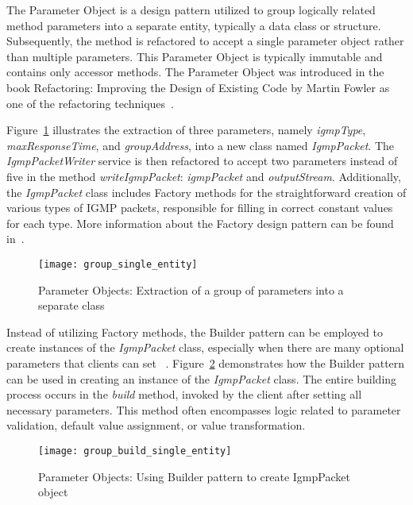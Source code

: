 The Parameter Object is a design pattern utilized to group logically related method parameters into a separate entity,
typically a data class or structure.
Subsequently, the method is refactored to accept a single parameter object rather than multiple parameters.
This Parameter Object is typically immutable and contains only accessor methods.
The Parameter Object was introduced in the book Refactoring: Improving the Design of Existing Code by Martin Fowler
as one of the refactoring techniques~\cite[Chapter~10]{fowler1999refactoring}.

Figure~\ref{fig:group_single_entity} illustrates the extraction of three parameters, namely \textit{igmpType},
\textit{maxResponseTime}, and \textit{groupAddress}, into a new class named \textit{IgmpPacket}.
The \textit{IgmpPacketWriter} service is then refactored to accept two parameters instead of five in the method
\textit{writeIgmpPacket}: \textit{igmpPacket} and \textit{outputStream}.
Additionally, the \textit{IgmpPacket} class includes Factory methods for the straightforward creation of various types
of IGMP packets, responsible for filling in correct constant values for each type.
More information about the Factory design pattern can be found in~\cite[Chapter~20]{posa4}.

\begin{figure}[!htb]
    \centering
    \texttt{[image: group\_single\_entity]}
    \caption{Parameter Objects: Extraction of a group of parameters into a separate class}
    \label{fig:group_single_entity}
\end{figure}

Instead of utilizing Factory methods, the Builder pattern can be employed to create instances
of the \textit{IgmpPacket} class, especially when there are many optional parameters that clients can set
~\cite[Chapter~20]{posa4}.
Figure~\ref{fig:group_build_single_entity} demonstrates how the Builder pattern can be used in creating
an instance of the \textit{IgmpPacket} class.
The entire building process occurs in the \textit{build} method, invoked by the client after setting
all necessary parameters.
This method often encompasses logic related to parameter validation, default value assignment, or value transformation.

\begin{figure}[!htb]
    \centering
    \texttt{[image: group\_build\_single\_entity]}
    \caption{Parameter Objects: Using Builder pattern to create IgmpPacket object}
    \label{fig:group_build_single_entity}
\end{figure}

